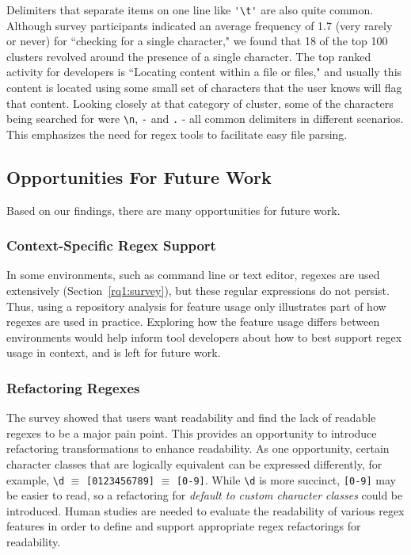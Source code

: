 Delimiters that separate items on one line like \verb!'\t'! are also quite common.  Although survey participants indicated an average frequency of 1.7 (very rarely or never) for ``checking for a single character," we found that 18 of the top 100 clusters revolved around the presence of a single character.
The top ranked activity for developers is ``Locating content within a file or files," and usually this content is located using some small set of characters that the user knows will flag that content.  Looking closely at that category of cluster, some of the characters being searched for were \verb!\n!, \verb!-! and \verb!.! - all common delimiters in different scenarios. This emphasizes the need for regex tools to  facilitate easy file parsing.



\subsection{Opportunities For Future Work}

Based on our findings, there are many opportunities for future work.



\subsubsection{Context-Specific Regex Support}
In some environments, such as command line or text editor, regexes are used extensively (Section~\ref{rq1:survey}), but these regular expressions do not persist. Thus, using a repository analysis for feature usage only illustrates part of how regexes are used in practice. Exploring how the feature usage differs between environments would help inform tool developers about how to best support regex usage in context, and is left for future work.

\subsubsection{Refactoring Regexes}
The survey showed that users want readability and find the lack of readable regexes to be a major pain point.
This provides an opportunity to introduce refactoring transformations to enhance readability.
As one opportunity, certain character classes that are logically equivalent can be expressed differently, for example, \verb!\d! $\equiv$ \verb![0123456789]! $\equiv$ \verb![0-9]!. While \verb!\d! is more succinct, \verb![0-9]! may be easier to read, so a refactoring for \emph{default to custom character classes} could be introduced.
Human studies are needed to evaluate the readability of various regex features in order to define and support appropriate regex refactorings for readability.

